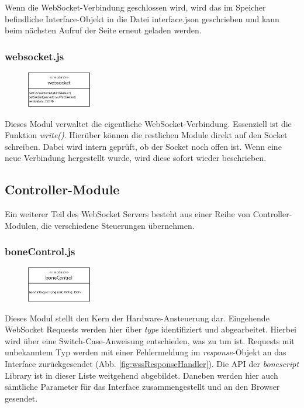Wenn die WebSocket-Verbindung geschlossen wird, wird das im Speicher befindliche Interface-Objekt in die Datei interface.json geschrieben und kann beim nächsten Aufruf der Seite erneut geladen werden.

\subsubsection{websocket.js}
\begin{figure}
\vspace{-14pt}
\centering
\includegraphics[width = 0.25\textwidth]{documentation/images/apiWebsocket.eps}
\end{figure}

Dieses Modul verwaltet die eigentliche WebSocket-Verbindung. Essenziell ist die Funktion \textit{write()}. Hierüber können die restlichen Module direkt auf den Socket schreiben. Dabei wird intern geprüft, ob der Socket noch offen ist. Wenn eine neue Verbindung hergestellt wurde, wird diese sofort wieder beschrieben.


\subsection{Controller-Module}
Ein weiterer Teil des WebSocket Servers besteht aus einer Reihe von Controller-Modulen, die verschiedene Steuerungen übernehmen.

\subsubsection{boneControl.js}
\begin{figure}
\vspace{-14pt}
\centering
\includegraphics[width = 0.25\textwidth]{documentation/images/apiBoneControl.eps}
\end{figure}

Dieses Modul stellt den Kern der Hardware-Ansteuerung dar. Eingehende WebSocket Requests werden hier über \textit{type} identifiziert und abgearbeitet. Hierbei wird über eine Switch-Case-Anweisung entschieden, was zu tun ist. Requests mit unbekanntem Typ werden mit einer Fehlermeldung im \textit{response}-Objekt an das Interface zurückgesendet (Abb. \ref{fig:wssResponseHandler}). Die API der \textit{bonescript} Library ist in dieser Liste weitgehend abgebildet. Daneben werden hier auch sämtliche Parameter für das Interface zusammengestellt und an den Browser gesendet.

